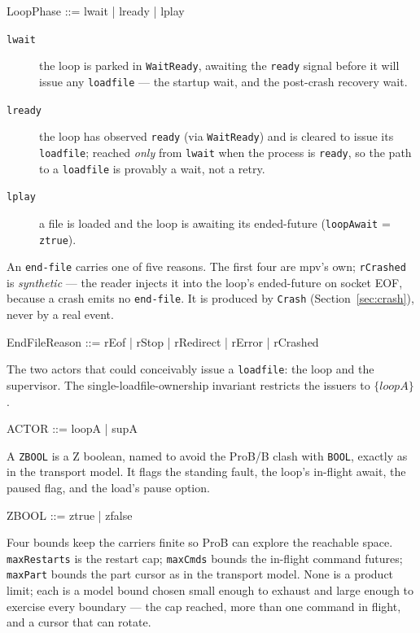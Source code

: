 \documentclass[a4paper,10pt,fleqn]{article}
\begin{document}
\begin{zed}
  LoopPhase ::= lwait | lready | lplay
\end{zed}

\begin{description}
  \item[\texttt{lwait}] the loop is parked in \texttt{WaitReady}, awaiting the
    \texttt{ready} signal before it will issue any \texttt{loadfile} --- the
    startup wait, and the post-crash recovery wait.
  \item[\texttt{lready}] the loop has observed \texttt{ready} (via
    \texttt{WaitReady}) and is cleared to issue its \texttt{loadfile}; reached
    \emph{only} from \texttt{lwait} when the process is \texttt{ready}, so the
    path to a \texttt{loadfile} is provably a wait, not a retry.
  \item[\texttt{lplay}] a file is loaded and the loop is awaiting its
    ended-future (\texttt{loopAwait} = \texttt{ztrue}).
\end{description}

An \texttt{end-file} carries one of five reasons. The first four are mpv's own;
\texttt{rCrashed} is \emph{synthetic} --- the reader injects it into the loop's
ended-future on socket EOF, because a crash emits no \texttt{end-file}. It is
produced by \texttt{Crash} (Section~\ref{sec:crash}), never by a real event.

\begin{zed}
  EndFileReason ::= rEof | rStop | rRedirect | rError | rCrashed
\end{zed}

The two actors that could conceivably issue a \texttt{loadfile}: the loop and
the supervisor. The single-loadfile-ownership invariant restricts the issuers
to $\{ loopA \}$.

\begin{zed}
  ACTOR ::= loopA | supA
\end{zed}

A \texttt{ZBOOL} is a Z boolean, named to avoid the ProB/B clash with
\texttt{BOOL}, exactly as in the transport model. It flags the standing fault,
the loop's in-flight await, the paused flag, and the load's pause option.

\begin{zed}
  ZBOOL ::= ztrue | zfalse
\end{zed}

Four bounds keep the carriers finite so ProB can explore the reachable space.
\texttt{maxRestarts} is the restart cap; \texttt{maxCmds} bounds the in-flight
command futures; \texttt{maxPart} bounds the part cursor as in the transport
model. None is a product limit; each is a model bound chosen small enough to
exhaust and large enough to exercise every boundary --- the cap reached, more
than one command in flight, and a cursor that can rotate.
\end{document}
